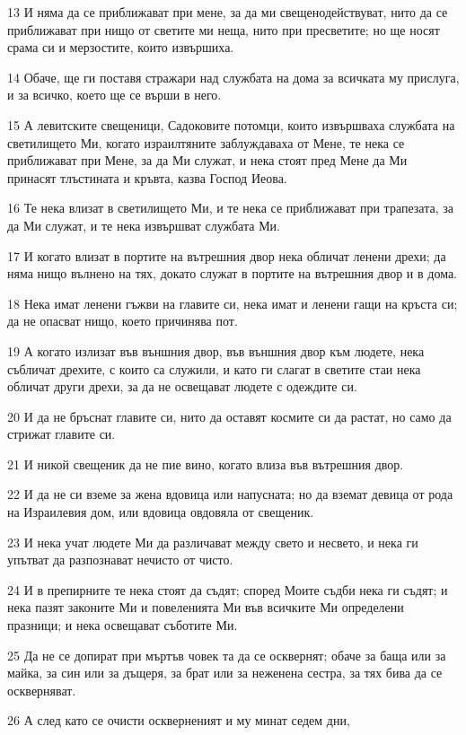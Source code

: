 \par 13 И няма да се приближават при мене, за да ми свещенодействуват, нито да се приближават при нищо от светите ми неща, нито при пресветите; но ще носят срама си и мерзостите, които извършиха.
\par 14 Обаче, ще ги поставя стражари над службата на дома за всичката му прислуга, и за всичко, което ще се върши в него.
\par 15 А левитските свещеници, Садоковите потомци, които извършваха службата на светилището Ми, когато израилтяните заблуждаваха от Мене, те нека се приближават при Мене, за да Ми служат, и нека стоят пред Мене да Ми принасят тлъстината и кръвта, казва Господ Иеова.
\par 16 Те нека влизат в светилището Ми, и те нека се приближават при трапезата, за да Ми служат, и те нека извършват службата Ми.
\par 17 И когато влизат в портите на вътрешния двор нека обличат ленени дрехи; да няма нищо вълнено на тях, докато служат в портите на вътрешния двор и в дома.
\par 18 Нека имат ленени гъжви на главите си, нека имат и ленени гащи на кръста си; да не опасват нищо, което причинява пот.
\par 19 А когато излизат във външния двор, във външния двор към людете, нека събличат дрехите, с които са служили, и като ги слагат в светите стаи нека обличат други дрехи, за да не освещават людете с одеждите си.
\par 20 И да не бръснат главите си, нито да оставят космите си да растат, но само да стрижат главите си.
\par 21 И никой свещеник да не пие вино, когато влиза във вътрешния двор.
\par 22 И да не си вземе за жена вдовица или напусната; но да вземат девица от рода на Израилевия дом, или вдовица овдовяла от свещеник.
\par 23 И нека учат людете Ми да различават между свето и несвето, и нека ги упътват да разпознават нечисто от чисто.
\par 24 И в препирните те нека стоят да съдят; според Моите съдби нека ги съдят; и нека пазят законите Ми и повеленията Ми във всичките Ми определени празници; и нека освещават съботите Ми.
\par 25 Да не се допират при мъртъв човек та да се осквернят; обаче за баща или за майка, за син или за дъщеря, за брат или за неженена сестра, за тях бива да се оскверняват.
\par 26 А след като се очисти оскверненият и му минат седем дни,
